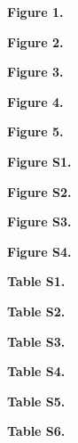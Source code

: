 \documentclass[10pt]{article}
\newcommand*{\commonDir}{./common/}    %
\begin{document}

\noindent\textbf{Figure 1.} 
\eeFBAfigOneCap

\hspace{1ex}

\noindent\textbf{Figure 2.} 
\eeFBAfigTwoCap

\hspace{1ex}

\noindent\textbf{Figure 3.} 
\eeFBAfigThreeCap

\hspace{1ex}

\noindent\textbf{Figure 4.}
\eeFBAfigFourCap

\hspace{1ex}

\noindent\textbf{Figure 5.}
\eeFBAfigFiveCap

\hspace{1ex}

\noindent\textbf{Figure S1.} 
\eeFBAfigSOneCap

\hspace{1ex}

\noindent\textbf{Figure S2.} 
\eeFBAfigSTwoCap

\hspace{1ex}

\noindent\textbf{Figure S3.} 
\eeFBAfigSThreeCap

\hspace{1ex}

\noindent\textbf{Figure S4.}
\eeFBAfigSFourCap

\hspace{1ex}

\noindent\textbf{Table S1.} 
\eeFBATabSOneCap

\hspace{1ex}

\noindent\textbf{Table S2.} 
\eeFBATabSTwoCap

\hspace{1ex}

\noindent\textbf{Table S3.} 
\eeFBATabSThreeCap

\hspace{1ex}

\noindent\textbf{Table S4.}
\eeFBATabSFourCap

\hspace{1ex}

\noindent\textbf{Table S5.}
\eeFBATabSFiveCap

\hspace{1ex}

\noindent\textbf{Table S6.}
\eeFBATabSSixCap

\hspace{1ex}






\end{document}
